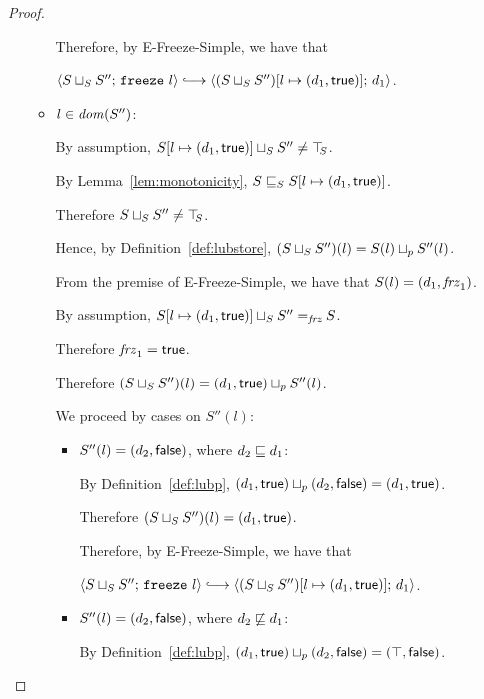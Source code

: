 \begin{proof}
\begin{itemize}
\begin{itemize}
        Therefore, by {\sc E-Freeze-Simple}, we have that

        $\config{\lubstore{S}{S''}}{\freeze{l}}
        \parstepsto
        \config{\extS{(\lubstore{S}{S''})}{l}{d_1}{\frozentrue}}{d_1}$.

      \item $l \in \mathit{dom}(S'')$:

        By assumption, $S[l \mapsto (d_1, \textsf{true})] \sqcup_{S} S''
        \neq \top\hspace{-0.85mm}_{S}$.

        By Lemma~\ref{lem:monotonicity},
        $S \sqsubseteq_S S[l \mapsto (d_1, \textsf{true})]$.

        Therefore $S \sqcup_{S} S'' \neq \top\hspace{-0.85mm}_{S}$.

        Hence, by Definition~\ref{def:lubstore},
        $(S \sqcup_{S} S'')(l) = S(l) \sqcup_p S''(l)$.

        From the premise of {\sc E-Freeze-Simple}, we have that
        $S(l) = (d_1, \mathit{frz}_1)$.

        By assumption, $S[l \mapsto (d_1, \textsf{true})] \sqcup_{S} S''
        =_{\textit{frz}} S$.

        Therefore $\mathit{frz}_1 = \textsf{true}$.

        Therefore $(S \sqcup_{S} S'')(l) =
        (d_1, \textsf{true}) \sqcup_p S''(l)$.

        We proceed by cases on $S''(l)$:
        \begin{itemize}
        \item $S''(l) = (d_2, \textsf{false})$, where $d_2 \sqsubseteq d_1$:

          By Definition~\ref{def:lubp},
          $(d_1, \textsf{true}) \sqcup_p (d_2, \textsf{false}) =
          (d_1, \textsf{true})$.

          Therefore $(S \sqcup_{S} S'')(l) =
          (d_1, \textsf{true})$.

          Therefore, by {\sc E-Freeze-Simple}, we have that

          $\config{\lubstore{S}{S''}}{\freeze{l}}
          \parstepsto
          \config{\extS{(\lubstore{S}{S''})}{l}{d_1}{\frozentrue}}{d_1}$.

        \item $S''(l) = (d_2, \textsf{false})$, where $d_2 \not \sqsubseteq d_1$:

          By Definition~\ref{def:lubp},
          $(d_1, \textsf{true}) \sqcup_p (d_2, \textsf{false})
          = (\top, \textsf{false})$.


\end{itemize}
\end{itemize}
\end{itemize}
\end{proof}
